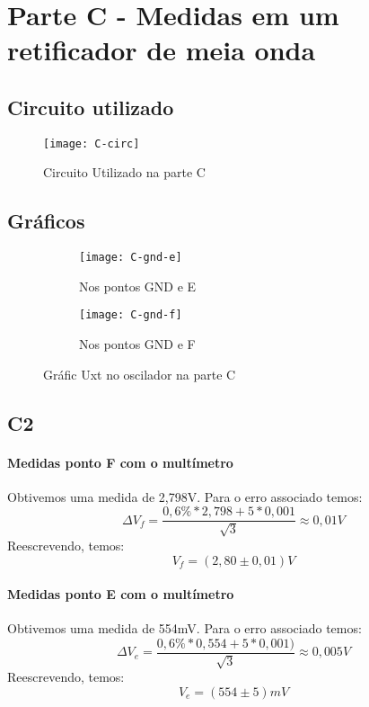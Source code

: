 \section{Parte C - Medidas em um retificador de meia onda}
    \subsection{Circuito utilizado}
        \begin{figure} [H] 
            \texttt{[image: C-circ]}
            \caption{Circuito Utilizado na parte C}
            \label{fig:C-circ}
        \end{figure}
    \subsection{Gráficos}
        \begin{figure} [H] 
            \begin{subfigure}[b]{7cm}  
                \texttt{[image: C-gnd-e]}
                \caption{Nos pontos GND e E}
                \label{fig:C-gnd-e}
            \end{subfigure}
            \begin{subfigure}[b]{7cm}  
                \texttt{[image: C-gnd-f]}
                \caption{Nos pontos GND e F}
                \label{fig:C-gnd-f}
            \end{subfigure}
                \caption{Gráfic Uxt no oscilador na parte C}
        \end{figure}
    \subsection{C2}
    \paragraph{Medidas ponto F com o multímetro}

    Obtivemos uma medida de 2,798V. 
    Para o erro associado temos:
    $$\Delta V_f = \frac{0,6\% * 2,798 + 5 * 0,001}{\sqrt{3}} \approx 0,01 V$$
    Reescrevendo, temos:
    $$V_f = (2,80\pm0,01) V$$

    \paragraph{Medidas ponto E com o multímetro} 
    Obtivemos uma medida de 554mV. 
    Para o erro associado temos:
    $$\Delta V_e = \frac{0,6\% * 0,554 + 5 * 0,001)}{\sqrt{3}} \approx 0,005 V$$
    Reescrevendo, temos:
    $$V_e = (554\pm5) mV$$

